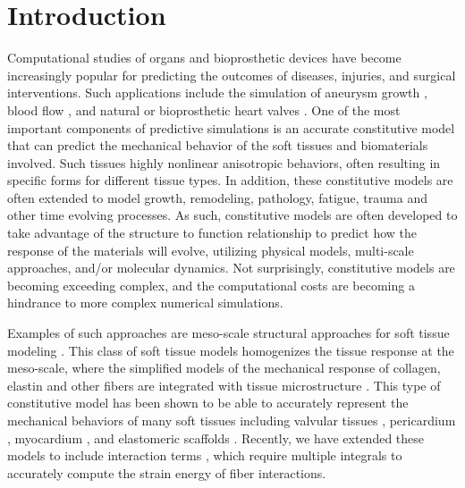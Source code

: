 
\section{Introduction}

	Computational studies of organs and bioprosthetic devices have become increasingly popular for predicting the outcomes of diseases, injuries, and surgical interventions. Such applications include the simulation of aneurysm growth \cite{rissland_abdominal_2009,ramault_comparison_2011,hoi_effects_2004,volokh_model_2008}, blood flow \cite{olufsen_numerical_2000,perktold_computer_1995,pries_blood_1990,oshima_finite_2001,bagchi_mesoscale_2007}, and natural or bioprosthetic heart valves \cite{zakerzadeh_computational_2017, soares_biomechanical_2016, kamensky_immersogeometric_2015, aggarwal_vivo_2016, nobili_numerical_2008, cheng_three_2004}. One of the most important components of predictive simulations is an accurate constitutive model that can predict the mechanical behavior of the soft tissues and biomaterials involved. Such tissues highly nonlinear anisotropic behaviors, often resulting in specific forms for different tissue types. In addition, these constitutive models are often extended to model growth, remodeling, pathology, fatigue, trauma and other time evolving processes. As such, constitutive models are often developed to take advantage of the structure to function relationship to predict how the response of the materials will evolve, utilizing physical models, multi-scale approaches, and/or molecular dynamics. Not surprisingly, constitutive models are becoming exceeding complex, and the computational costs are becoming a hindrance to more complex numerical simulations. 


	Examples of such approaches are meso-scale structural approaches for soft tissue modeling \cite{lanir_constitutive_1983}. This class of soft tissue models homogenizes the tissue response at the meso-scale, where the simplified models of the mechanical response of collagen, elastin and other fibers are integrated with tissue microstructure \cite{kassab_structure_2016}. This type of constitutive model has been shown to be able to accurately represent the mechanical behaviors of many soft tissues including valvular tissues \cite{zhang_meso_2016, rego_mitral_2016}, pericardium \cite{zhang_modeling_2017}, myocardium \cite{avazmohammadi_novel_2017}, and elastomeric scaffolds \cite{d.amore_large_2016}. Recently, we have extended these models to include interaction terms \cite{zhang_modeling_2017, avazmohammadi_novel_2017}, which require multiple integrals to accurately compute the strain energy of fiber interactions. 




